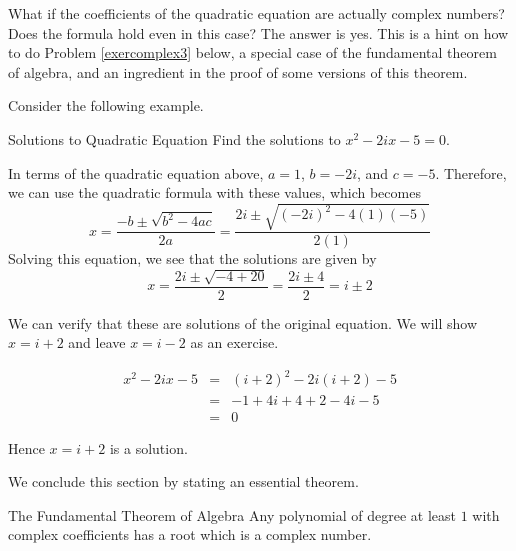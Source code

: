 What if the coefficients of the quadratic equation are actually complex
numbers? Does the formula hold even in this case? The answer is yes. This is
a hint on how to do Problem \ref{exercomplex3} below, a special case of the
fundamental theorem of algebra, and an ingredient in the proof of some
versions of this theorem. 

Consider the following example. 

\begin{example}{Solutions to Quadratic Equation}\label{exa:quadraticequationcomplex}
Find the solutions to $x^{2}-2ix-5=0$.
\end{example}

\begin{solution}
In terms of the quadratic equation above, $a=1$, $b=-2i$, and $c=-5$.
Therefore, we can use the quadratic formula with these values, which becomes
\begin{equation*}
x=
\frac{-b\pm \sqrt{b^{2}-4ac}}{2a}
= 
\frac{2i \pm \sqrt{\left(-2i\right)^{2} - 4 (1)(-5)}}{2(1)}
\end{equation*}
Solving this equation, we see that the solutions are given by
\begin{equation*}
x=\frac{2i\pm \sqrt{-4+20}}{2}=\frac{2i\pm 4}{2}=i\pm 2
\end{equation*}

We can verify that these are solutions of the original equation. 
We will show $x = i + 2$ and leave $x = i-2$ as an exercise.

\begin{eqnarray*}
x^{2}-2ix-5
&=& (i+2)^2 - 2i (i+2) - 5 \\
&=& -1 + 4i + 4 + 2 - 4i - 5 \\
&=& 0
\end{eqnarray*}

Hence $x = i+2$ is a solution. 
\end{solution}

We conclude this section by stating an essential theorem.

\begin{theorem}{The Fundamental Theorem of Algebra}\label{thm:fundtheorem}
Any polynomial of degree at least $1$ with complex coefficients has a root which is a complex number.
\end{theorem}